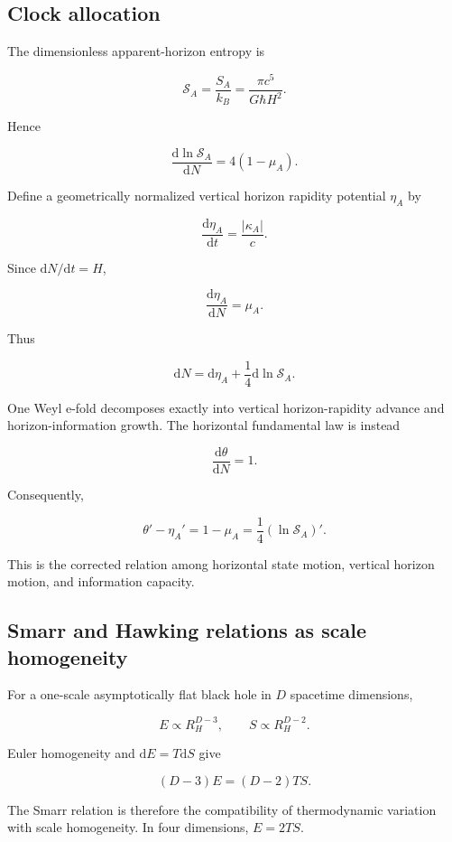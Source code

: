 \documentclass[
  11pt,
  letterpaper,
]{article}
\begin{document}
\subsection{Clock allocation}\label{clock-allocation}

The dimensionless apparent-horizon entropy is

\[
\mathcal S_A=\frac{S_A}{k_B}=\frac{\pi c^5}{G\hbar H^2}.
\]

Hence

\[
\frac{\mathrm d\ln\mathcal S_A}{\mathrm dN}=4(1-\mu_A).
\]

Define a geometrically normalized vertical horizon rapidity potential
\(\eta_A\) by

\[
\frac{\mathrm d\eta_A}{\mathrm dt}=\frac{|\kappa_A|}{c}.
\]

Since \(\mathrm dN/\mathrm dt=H\),

\[
\frac{\mathrm d\eta_A}{\mathrm dN}=\mu_A.
\]

Thus

\[
\boxed{
\mathrm dN=\mathrm d\eta_A+\frac14\mathrm d\ln\mathcal S_A.
}
\]

One Weyl e-fold decomposes exactly into vertical horizon-rapidity
advance and horizon-information growth. The horizontal fundamental law
is instead

\[
\frac{\mathrm d\theta}{\mathrm dN}=1.
\]

Consequently,

\[
\boxed{
\theta'-\eta_A'
=1-\mu_A
=\frac14(\ln\mathcal S_A)'.
}
\]

This is the corrected relation among horizontal state motion, vertical
horizon motion, and information capacity.

\subsection{Smarr and Hawking relations as scale
homogeneity}\label{smarr-and-hawking-relations-as-scale-homogeneity}

For a one-scale asymptotically flat black hole in \(D\) spacetime
dimensions,

\[
E\propto R_H^{D-3},
\qquad
S\propto R_H^{D-2}.
\]

Euler homogeneity and \(\mathrm dE=T\mathrm dS\) give

\[
\boxed{
(D-3)E=(D-2)TS.
}
\]

The Smarr relation is therefore the compatibility of thermodynamic
variation with scale homogeneity. In four dimensions, \(E=2TS\).
\end{document}
